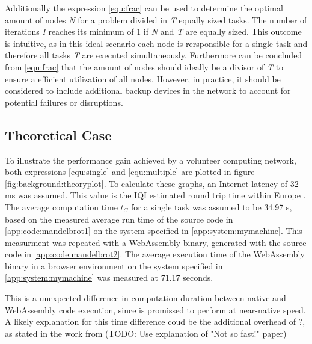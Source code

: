 Additionally the expression \eqref{equ:frac} can be used to determine the optimal amount of nodes \emph{N} for a problem divided in \emph{T} equally sized tasks. The number of iterations \emph{I} reaches its minimum of $1$ if \emph{N} and \emph{T} are equally sized. This outcome is intuitive, as in this ideal scenario each node is rersponsible for a single task and therefore all tasks \emph{T} are executed simultaneously. Furthermore can be concluded from \eqref{equ:frac} that the amount of nodes should ideally be a divisor of \emph{T} to ensure a efficient utilization of all nodes. However, in practice, it should be considered to include additional backup devices in the network to account for potential failures or disruptions.

\subsection{Theoretical Case}
To illustrate the performance gain achieved by a volunteer computing network, both expressions \eqref{equ:single} and \eqref{equ:multiple} are plotted in figure \ref{fig:background:theoryplot}. To calculate these graphs, an Internet latency of 32 ms \cite{backend:latency} was assumed. This value is the \ac{IQI} estimated round trip time within Europe \cite{backend:latency}. The average computation time $t_{C}$ for a single task was assumed to be 34.97 s, based on the measured average run time of the source code in \ref{app:code:mandelbrot1} on the system specified in \ref{app:system:mymachine}. This measurment was repeated with a WebAssembly binary, generated with the source code in \ref{app:code:mandelbrot2}. The average execution time of the WebAssembly binary in a browser environment on the system specified in \ref{app:system:mymachine} was measured at 71.17 seconds. 

This is a unexpected difference in computation duration between native and WebAssembly code execution, since is promissed to perform at near-native speed. \cite{methodology:wasm} A likely explanation for this time difference coud be the additional overhead of ?, as stated in the work from (TODO: Use explanation of "Not so fast!" paper)

